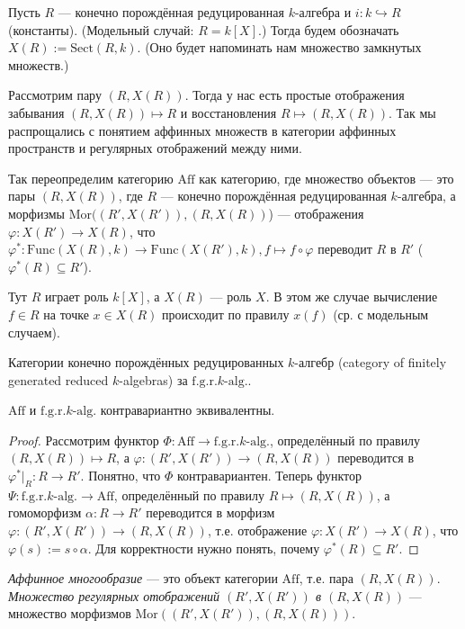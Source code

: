 \documentclass[12pt,a4paper]{article}
\newcommand{\Func}{\mathrm{Func}}
\newcommand{\Aff}{\mathrm{Aff}}
\newcommand{\Mor}{\mathrm{Mor}}
\newcommand{\Sect}{\mathrm{Sect}}
\newcommand{\fgrkalg}[1][k]{\text{f.g.r.$#1$-alg.}}
\begin{document}
    \begin{definition}
        Пусть $R$ --- конечно порождённая редуцированная $k$-алгебра и $i: k \hookrightarrow R$ (константы). (Модельный случай: $R = k[X]$.) Тогда будем обозначать $X(R) := \Sect(R, k)$. (Оно будет напоминать нам множество замкнутых множеств.)

        Рассмотрим пару $(R, X(R))$. Тогда у нас есть простые отображения забывания $(R, X(R)) \mapsto R$ и восстановления $R \mapsto (R, X(R))$. Так мы распрощались с понятием аффинных множеств в категории аффинных пространств и регулярных отображений между ними.

        Так переопределим категорию $\Aff$ как категорию, где множество объектов --- это пары $(R, X(R))$, где $R$ --- конечно порождённая редуцированная $k$-алгебра, а морфизмы $\Mor((R', X(R')), (R, X(R))$) --- отображения $\varphi: X(R') \to X(R)$, что $\varphi^*: \Func(X(R), k) \to \Func(X(R'), k), f \mapsto f \circ \varphi$ переводит $R$ в $R'$ ($\varphi^*(R) \subseteq R'$).

        Тут $R$ играет роль $k[X]$, а $X(R)$ --- роль $X$. В этом же случае вычисление $f \in R$ на точке $x \in X(R)$ происходит по правилу $x(f)$ (ср. с модельным случаем).

        Категории конечно порождённых редуцированных $k$-алгебр (category of finitely generated reduced $k$-algebras) за $\fgrkalg$.
    \end{definition}

    \begin{theorem}
        $\Aff$ и $\fgrkalg$ контравариантно эквивалентны.
    \end{theorem}

    \begin{proof}
        Рассмотрим функтор $\Phi: \Aff \to \fgrkalg$, определённый по правилу $(R, X(R)) \mapsto R$, а $\varphi: (R', X(R')) \to (R, X(R))$ переводится в $\varphi^*|_R: R \to R'$. Понятно, что $\Phi$ контравариантен. Теперь функтор $\Psi: \fgrkalg \to \Aff$, определённый по правилу $R \mapsto (R, X(R))$, а гомоморфизм $\alpha: R \to R'$ переводится в морфизм $\varphi: (R', X(R')) \to (R, X(R))$, т.е. отображение $\varphi: X(R') \to X(R)$, что $\varphi(s) := s \circ \alpha$. Для корректности нужно понять, почему $\varphi^*(R) \subseteq R'$.

    \end{proof}

    \begin{definition}
        \emph{Аффинное многообразие} --- это объект категории $\Aff$, т.е. пара $(R, X(R))$. \emph{Множество регулярных отображений $(R', X(R'))$ в $(R, X(R))$} --- множество морфизмов $\Mor((R', X(R')), (R, X(R)))$.
    \end{definition}
\end{document}
